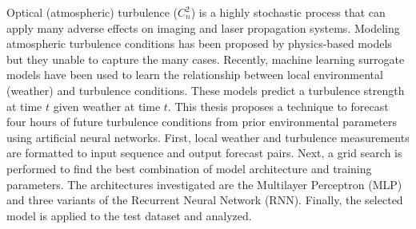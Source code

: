 Optical (atmospheric) turbulence ($C_{n}^{2}$) is a highly stochastic process that can apply many adverse effects on imaging and laser propagation systems. Modeling atmospheric turbulence conditions has been proposed by physics-based models but they unable to capture the many cases. Recently, machine learning surrogate models have been used to learn the relationship between local environmental (weather) and turbulence conditions. These models predict a turbulence strength at time $t$ given weather at time $t$. This thesis proposes a technique to forecast four hours of future turbulence conditions from prior environmental parameters using artificial neural networks. First, local weather and turbulence measurements are formatted to input sequence and output forecast pairs. Next, a grid search is performed to find the best combination of model architecture and training parameters. The architectures investigated are the Multilayer Perceptron (MLP) and three variants of the Recurrent Neural Network (RNN). Finally, the selected model is applied to the test dataset and analyzed.
